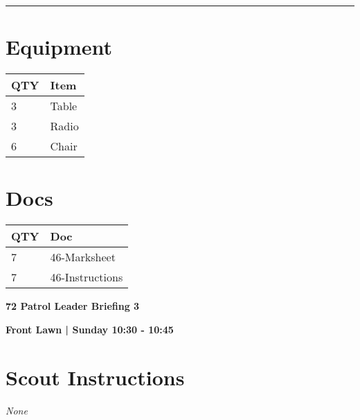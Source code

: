 \documentclass[10pt]{article}
\newcommand{\newtitle}[1]{\begin{center}{\Huge\bfseries #1 }\\ \vspace{5mm}\end{center}}
\newcommand{\newsubtitle}[1]{\begin{center}{\color{grey}\Large\bfseries #1 }\\ \vspace{5mm}\end{center}}
\begin{document}
			\vspace{0.5cm}
	\hrule
	\vspace{0.5cm}

	\begin{multicols}{2}

		\section*{\faWrench \: Equipment}

		
	\begin{center}
			\begin{tabular}{p{2cm}p{4cm}}


				\textbf{QTY} & \textbf{Item} \\\toprule
												3&Table\\\midrule
												3&Radio\\\midrule
												6&Chair\\\midrule
								\end{tabular}

			\end{center}

		
		\vfill\null
		\columnbreak

			\section*{\faFile \: Docs}
		 	\begin{center}
			\begin{tabular}{p{2cm}p{4cm}}

			\textbf{QTY} & \textbf{Doc} \\\toprule
										7&46-Marksheet\\\midrule
										7&46-Instructions\\\midrule
							\end{tabular}
			\end{center}
	

		\vfill\null

		\end{multicols}



	\vspace{1cm}


	\clearpage
		\newtitle{72 Patrol Leader Briefing 3 }
	\newsubtitle{Front Lawn | Sunday 10:30 - 10:45}
		\setcounter{section}{71}
	\section*{Scout Instructions}
		\textit{None}
	
\end{document}
